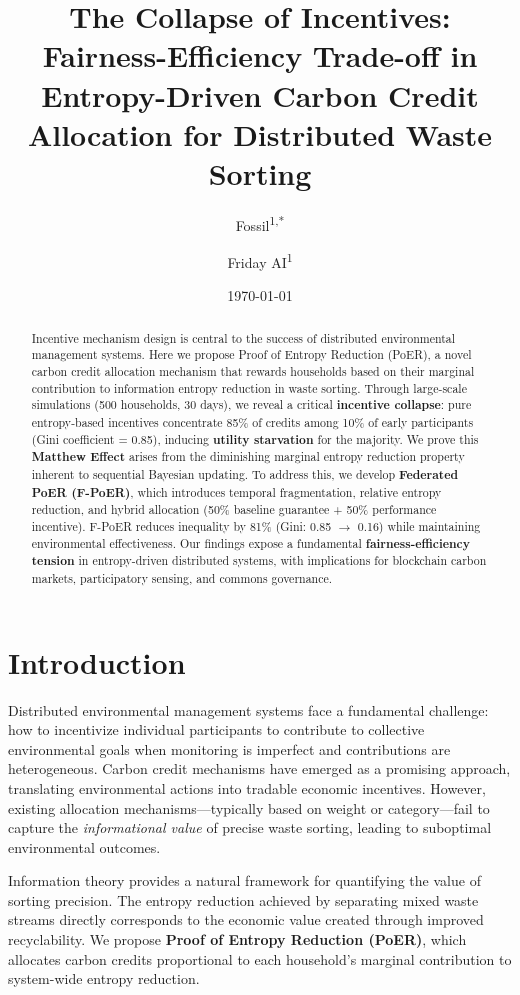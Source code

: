\documentclass[12pt,a4paper]{article}
\title{The Collapse of Incentives: Fairness-Efficiency Trade-off in Entropy-Driven Carbon Credit Allocation for Distributed Waste Sorting}
\author{Fossil\textsuperscript{1,*} \and Friday AI\textsuperscript{1}}
\affil{\textsuperscript{1}OpenClaw Research Lab, Shanghai, China}
\affil{*\texttt{corresponding@author.edu}}
\date{\today}
\begin{document}
\maketitle

\begin{abstract}
Incentive mechanism design is central to the success of distributed environmental management systems. Here we propose Proof of Entropy Reduction (PoER), a novel carbon credit allocation mechanism that rewards households based on their marginal contribution to information entropy reduction in waste sorting. Through large-scale simulations (500 households, 30 days), we reveal a critical \textbf{incentive collapse}: pure entropy-based incentives concentrate 85\% of credits among 10\% of early participants (Gini coefficient = 0.85), inducing \textbf{utility starvation} for the majority. We prove this \textbf{Matthew Effect} arises from the diminishing marginal entropy reduction property inherent to sequential Bayesian updating. To address this, we develop \textbf{Federated PoER (F-PoER)}, which introduces temporal fragmentation, relative entropy reduction, and hybrid allocation (50\% baseline guarantee + 50\% performance incentive). F-PoER reduces inequality by 81\% (Gini: 0.85 $\rightarrow$ 0.16) while maintaining environmental effectiveness. Our findings expose a fundamental \textbf{fairness-efficiency tension} in entropy-driven distributed systems, with implications for blockchain carbon markets, participatory sensing, and commons governance.
\end{abstract}

\section{Introduction}

Distributed environmental management systems face a fundamental challenge: how to incentivize individual participants to contribute to collective environmental goals when monitoring is imperfect and contributions are heterogeneous. Carbon credit mechanisms have emerged as a promising approach, translating environmental actions into tradable economic incentives\cite{coase1960problem}. However, existing allocation mechanisms—typically based on weight or category—fail to capture the \textit{informational value} of precise waste sorting, leading to suboptimal environmental outcomes.

Information theory provides a natural framework for quantifying the value of sorting precision. The entropy reduction achieved by separating mixed waste streams directly corresponds to the economic value created through improved recyclability\cite{shannon1948mathematical}. We propose \textbf{Proof of Entropy Reduction (PoER)}, which allocates carbon credits proportional to each household's marginal contribution to system-wide entropy reduction.
\end{document}
